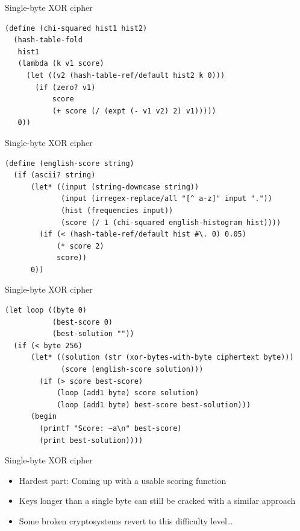 \documentclass[presentation]{beamer}
\begin{document}
\begin{frame}[fragile,label=sec-2-12]{Single-byte XOR cipher}
 \begin{verbatim}
(define (chi-squared hist1 hist2)
  (hash-table-fold
   hist1
   (lambda (k v1 score)
     (let ((v2 (hash-table-ref/default hist2 k 0)))
       (if (zero? v1)
           score
           (+ score (/ (expt (- v1 v2) 2) v1)))))
   0))
\end{verbatim}
\end{frame}

\begin{frame}[fragile,label=sec-2-13]{Single-byte XOR cipher}
 \begin{verbatim}
(define (english-score string)
  (if (ascii? string)
      (let* ((input (string-downcase string))
             (input (irregex-replace/all "[^ a-z]" input "."))
             (hist (frequencies input))
             (score (/ 1 (chi-squared english-histogram hist))))
        (if (< (hash-table-ref/default hist #\. 0) 0.05)
            (* score 2)
            score))
      0))
\end{verbatim}
\end{frame}

\begin{frame}[fragile,label=sec-2-14]{Single-byte XOR cipher}
 \begin{verbatim}
(let loop ((byte 0)
           (best-score 0)
           (best-solution ""))
  (if (< byte 256)
      (let* ((solution (str (xor-bytes-with-byte ciphertext byte)))
             (score (english-score solution)))
        (if (> score best-score)
            (loop (add1 byte) score solution)
            (loop (add1 byte) best-score best-solution)))
      (begin
        (printf "Score: ~a\n" best-score)
        (print best-solution))))
\end{verbatim}
\end{frame}

\begin{frame}[label=sec-2-15]{Single-byte XOR cipher}
\begin{itemize}
\item Hardest part: Coming up with a usable scoring function
\item Keys longer than a single byte can still be cracked with a similar
approach
\item Some broken cryptosystems revert to this difficulty level\ldots{}
\end{itemize}
\end{frame}
\end{document}
